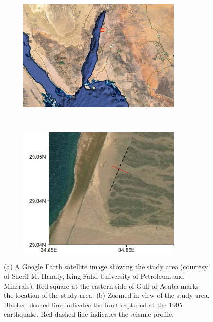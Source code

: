  \begin{figure}
       \centering
       \begin{subfigure}[b]{.45\textwidth}
               \centering
               \includegraphics[width=0.9\textwidth, height=0.7\textwidth]{figures/chap04_field_data/golf_aqaba.png} 
               \caption{}
               \label{fig:golf_aqaba}
       \end{subfigure}%
       ~
       \begin{subfigure}[b]{.45\textwidth}
               \centering
               \includegraphics[width=0.9\textwidth,
               height=0.7\textwidth]{figures/chap04_field_data/location.png}
               \caption{}
               \label{fig:location}
       \end{subfigure}
       \caption{(a) A Google Earth satellite image showing the study area  (courtesy of  Sherif M. Hanafy, King Fahd University of Petroleum and Minerals). Red square at the eastern side of Gulf of Aqaba marks the location of the study area.  (b) Zoomed in view of the study area.  Blacked dashed line indicates the fault raptured at the 1995 earthquake. Red dashed line indicates the seismic profile.}
       \label{fig:golf_aqaba_location}
\end{figure}

